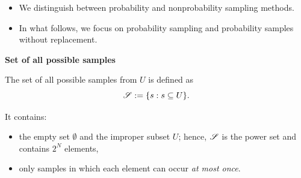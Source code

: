 \documentclass{my_eth_beamer}
\numberwithin{equation}{section}
\begin{document}
\begin{frame}
    \begin{itemize}
    \setlength{\itemsep}{8pt}
        \item We distinguish between \alert{probability} and
            \alert{nonprobability} sampling methods.
        \item In what follows, we focus on \alert{probability sampling} and
            probability samples \alert{without replacement}.
    \end{itemize}
    \vspace{1.5em}
    \textcolor{fhnwblue}{\bfseries Set of all possible samples}
    \vspace{0.5em}

    The \alert{set of all possible} samples from $U$ is defined as
    \begin{equation*}
        \mathscr{S} := \{s : s \subseteq U\}.
    \end{equation*}

    \vspace{-1em}

    It contains:

    \begin{itemize}
    \setlength{\itemsep}{6pt}
        \item the empty set $\emptyset$ and the improper subset $U$;
            hence, $\mathscr{S}$ is the power set and contains $2^N$
            elements,
        \item only samples in which each element can occur
            \emph{at most once}.
    \end{itemize}
\end{frame}
\end{document}
